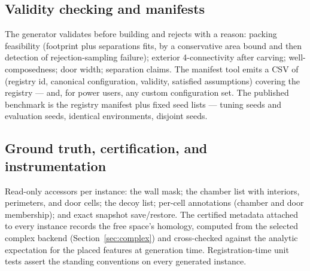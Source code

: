 \documentclass[11pt]{article}
\begin{document}
\subsection{Validity checking and manifests}

The generator validates before building and rejects with a reason:
packing feasibility (footprint plus separations fits, by a
conservative area bound and then detection of rejection-sampling
failure); exterior 4-connectivity after carving; well-composedness;
door width; separation claims. The manifest tool emits a CSV of
(registry id, canonical configuration, validity, satisfied
assumptions) covering the registry --- and, for power users, any
custom configuration set. The published benchmark is the registry
manifest plus fixed seed lists --- tuning seeds and evaluation seeds,
identical environments, disjoint seeds.

\subsection{Ground truth, certification, and instrumentation}

Read-only accessors per instance: the wall mask; the chamber list
with interiors, perimeters, and door cells; the decoy list; per-cell
annotations (chamber and door membership); and exact snapshot
save/restore. The certified metadata attached to every instance
records the free space's homology, computed from the selected complex
backend (Section~\ref{sec:complex}) and cross-checked against the
analytic expectation for the placed features at generation time.
Registration-time unit tests assert the standing conventions on every
generated instance.
\end{document}
